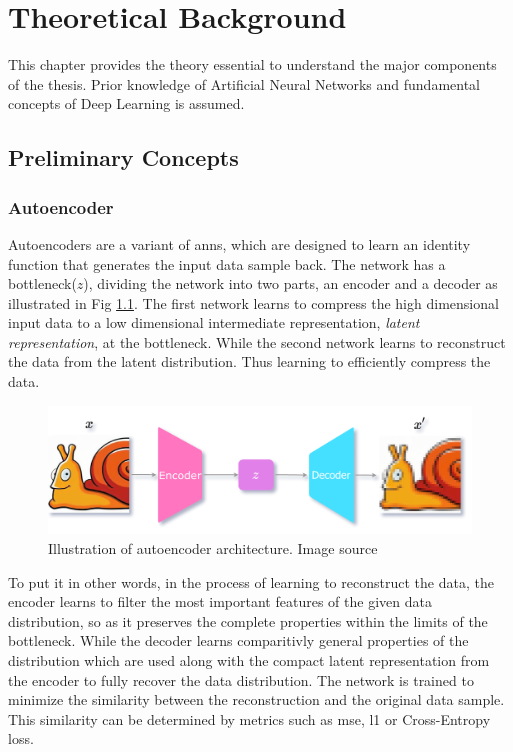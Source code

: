 \chapter{Theoretical Background}
\label{chap:background}

This chapter provides the theory essential to understand the major components of the thesis. Prior knowledge of Artificial Neural Networks \cite{theory_ann_wiki} and fundamental concepts of Deep Learning \cite{theory_dl} is assumed.

\section{Preliminary Concepts}
\label{sec:Preliminary}

\subsection{Autoencoder}
Autoencoders are a variant of \acp{ann}, which are designed to learn an identity function that generates the input data sample back. The network has a bottleneck($z$), dividing the network into two parts, an encoder and a decoder as illustrated in Fig \ref{fig:ae_arch}. The first network learns to compress the high dimensional input data to a low dimensional intermediate representation, \textit{latent representation}, at the bottleneck. While the second network learns to reconstruct the data from the latent distribution. Thus learning to efficiently compress the data.

\begin{figure}[!h]
    \centering
    \includegraphics[scale=0.2]{figures/arch/ae_arch.png}
    \caption{Illustration of autoencoder architecture. Image source \cite{deepimageprior}}
    \label{fig:ae_arch}
\end{figure}

To put it in other words, in the process of learning to reconstruct the data, the encoder learns to filter the most important features of the given data distribution, so as it preserves the complete properties within the limits of the bottleneck. While the decoder learns comparitivly general properties of the distribution which are used along with the compact latent representation from the encoder to fully recover the data distribution. The network is trained to minimize the similarity between the reconstruction and the original data sample. This similarity can be determined by metrics such as \ac{mse}, \ac{l1} or Cross-Entropy loss.

